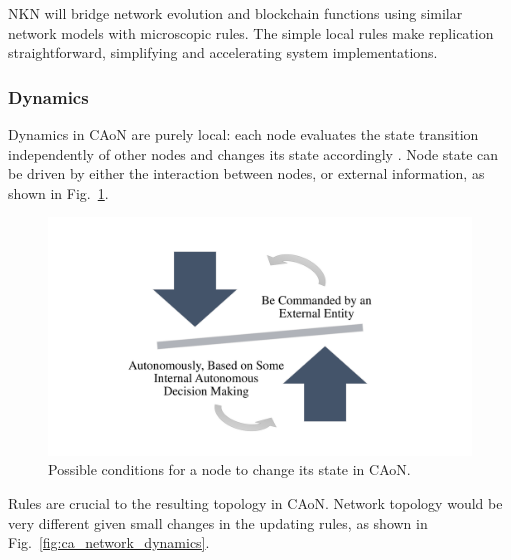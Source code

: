 \documentclass[reprint,pre,aps]{revtex4-1}
\begin{document}
NKN will bridge network evolution and blockchain functions using similar network models with microscopic rules. The simple local rules make replication straightforward, simplifying and accelerating system implementations.

\subsubsection{Dynamics}

Dynamics in CAoN are purely local: each node evaluates the state transition independently of other nodes and changes its state accordingly \cite{chopard1998cellular}. Node state can be driven by either the interaction between nodes, or external information, as shown in Fig.~\ref{fig:node_change_state_condition}.

\begin{figure}[!htp]
\centering
\includegraphics[width=0.7\linewidth]{fig/node_change_state_condition}
\caption{Possible conditions for a node to change its state in CAoN.}
\label{fig:node_change_state_condition}
\end{figure}

Rules are crucial to the resulting topology in CAoN. Network topology would be very different given small changes in the updating rules, as shown in Fig.~\ref{fig:ca_network_dynamics}.
\end{document}
